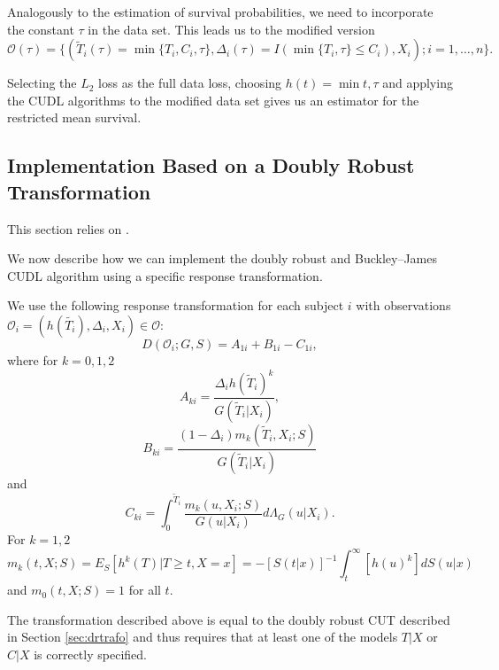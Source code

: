 \documentclass[12pt, a4paper]{scrartcl}
\theoremstyle{definition}
\theoremstyle{plain}
\numberwithin{equation}{section}
\numberwithin{figure}{section}
\numberwithin{table}{section}
\begin{document}
	Analogously to the estimation of survival probabilities, we need to incorporate the constant $\tau$ in the data set.
	This leads us to the modified version	
	\begin{equation*}
		\mathcal{O}(\tau) = \{(\tilde{T}_i(\tau) = \min\{T_i, C_i, \tau\}, \Delta_i(\tau) = I(\min\{T_i, \tau\}\leq C_i), X_i); i = 1, \dots , n\}.
	\end{equation*}
	
	Selecting the $L_2$ loss as the full data loss, choosing $h(t) = \min{t,\tau}$ and applying the CUDL algorithms to the modified data set gives us an estimator for the restricted mean survival.
	
	\subsection{Implementation Based on a Doubly Robust Transformation}\label{trafo}

	This section relies on \citet*{basearticle}.
	
	We now describe how we can implement the doubly robust and Buckley--James CUDL algorithm using a specific response transformation.
	
	We use the following response transformation for each subject $i$ with observations $\mathcal{O}_i = (h(\tilde{T_i}), \Delta_i, X_i) \in \mathcal{O}$:
	\begin{equation*}
	D(\mathcal O_i; G,S) = A_{1i}+B_{1i} - C_{1i},
	\end{equation*}
	where for $k=0,1,2$
	\begin{equation*}
	A_{ki} = \frac{\Delta_i h(\tilde{T}_i)^k}{G(\tilde{T}_i\vert X_i)},
	\end{equation*}
	\begin{equation*}
	B_{ki} = \frac{(1-\Delta_i)m_k(\tilde{T}_i, X_i; S)}{G(\tilde{T}_i\vert X_i)}
	\end{equation*}
	and
	\begin{equation*}
	C_{ki} = \int_{0}^{\tilde{T}_i} \frac{m_k(u, X_i; S)}{G(u \vert X_i)}d\Lambda_G(u \vert X_i).
	\end{equation*}
	For $k=1,2$
	\begin{equation}\label{eq:condexp}
	m_k(t,X;S) = E_S[h^k(T) \vert T \geq t, X = x] = -[S(t\vert x)]^{-1} \int_{t}^{\infty}[h(u)^k]dS(u\vert x)
	\end{equation}
	and $m_0(t,X;S) = 1$ for all $t$.
	
	The transformation described above is equal to the doubly robust CUT described in Section \ref{sec:drtrafo} and thus requires that at least one of the models $T\vert X$ or $C \vert X$ is correctly specified.
	
\end{document}
